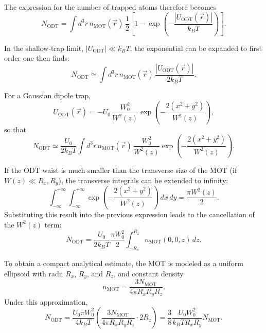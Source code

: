 The expression for the number of trapped atoms therefore becomes
\begin{equation}
    N_{\mathrm{ODT}} =
    \int d^3r\, n_{\mathrm{MOT}}(\vec{r})\,
    \frac{1}{2}
    \left[
        1 - \exp\left(-\frac{|U_{\mathrm{ODT}}(\vec{r})|}{k_B T}\right)
    \right].
\end{equation}

In the shallow-trap limit, $|U_{\mathrm{ODT}}| \ll k_B T$, the exponential can be expanded to first order one then finds:
\begin{equation}
    N_{\mathrm{ODT}}
    \simeq
    \int d^3r\, n_{\mathrm{MOT}}(\vec{r})\,
    \frac{|U_{\mathrm{ODT}}(\vec{r})|}{2k_B T}.
\end{equation}

For a Gaussian dipole trap,
\begin{equation}
    U_{\mathrm{ODT}}(\vec{r}) =
    -U_0\,
    \frac{W_0^2}{W^2(z)}
    \exp\left(-\frac{2(x^2+y^2)}{W^2(z)}\right),
\end{equation}
so that
\begin{equation}
    N_{\mathrm{ODT}}
    \simeq
    \frac{U_0}{2k_B T}
    \int d^3r\, n_{\mathrm{MOT}}(\vec{r})\,
    \frac{W_0^2}{W^2(z)}
    \exp\left(-\frac{2(x^2+y^2)}{W^2(z)}\right).
\end{equation}

If the ODT waist is much smaller than the transverse size of the MOT (if $W(z) \ll R_x, R_y$), the transverse integrals can be extended to infinity:
\begin{equation}
    \int_{-\infty}^{+\infty}\int_{-\infty}^{+\infty}
    \exp\left(-\frac{2(x^2+y^2)}{W^2(z)}\right)\,dx\,dy
    =
    \frac{\pi W^2(z)}{2}.
\end{equation}
Substituting this result into the previous expression leads to the cancellation of the $W^2(z)$ term:
\begin{equation}
    N_{\mathrm{ODT}}
    =
    \frac{U_0}{2k_B T}
    \frac{\pi W_0^2}{2}
    \int_{-R_z}^{R_z} n_{\mathrm{MOT}}(0,0,z)\,dz.
\end{equation}

To obtain a compact analytical estimate, the MOT is modeled as a uniform ellipsoid with radii $R_x$, $R_y$, and $R_z$, and constant density
\begin{equation}
    n_{\mathrm{MOT}} =
    \frac{3N_{\mathrm{MOT}}}{4\pi R_x R_y R_z}.
\end{equation}
Under this approximation,
\begin{equation}
    N_{\mathrm{ODT}}
    =
    \frac{U_0 \pi W_0^2}{4k_B T}
    \left(
        \frac{3N_{\mathrm{MOT}}}{4\pi R_x R_y R_z}\cdot 2R_z
    \right)
    =
    \frac{3}{8}
    \frac{U_0 W_0^2}{k_B T R_x R_y}
    N_{\mathrm{MOT}}.
\end{equation} 
